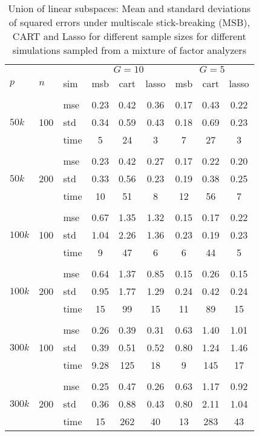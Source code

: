 \documentclass{article} %
\begin{document}
\begin{table}[t]
\caption{Union of linear subspaces: Mean and standard deviations of squared errors under multiscale stick-breaking (MSB), CART and Lasso for different sample sizes for different simulations sampled from a mixture of factor analyzers}\label{table:mfa}
\vskip 0.15in
\begin{center}
\begin{small}
\begin{sc}
\begin{tabular}{lllcccccc}
\hline
&&&\multicolumn{3}{c}{$G=10$}&\multicolumn{3}{c}{$G=5$}\\
$p$&$n$& sim& msb&cart&lasso & msb&cart&lasso\\
\\
\multirow{3}{*}{$50k$}&\multirow{3}{*}{100}&mse&0.23&0.42&0.36&0.17&0.43&0.22\\
&&std & 0.34 &0.59&0.43&0.18&0.69&0.23\\
&&time &5&24 & 3&7&27&3\\

\\
\multirow{3}{*}{$50k$}&\multirow{3}{*}{200}&mse&0.23 &0.42 &0.27&0.17&0.22&0.20\\
&&std & 0.33& 0.56&0.23&0.19&0.38&0.25\\
&&time & 10 &51&8&12&56&7\\

\\
\multirow{3}{*}{$100k$}&\multirow{3}{*}{100}&mse&0.67&1.35&1.32&0.15&0.17&0.22\\
&&std & 1.04&2.26&1.36&0.23&0.19&0.23\\
&&time &9&47&6&6&44&5\\

\\
\multirow{3}{*}{$100k$}&\multirow{3}{*}{200}&mse&0.64&1.37&0.85&0.15&0.26&0.15\\
&&std &0.95 &1.77&1.29&0.24&0.42&0.24\\
&&time &15&99&15&11&89&15\\
\\
\multirow{3}{*}{$300k$}&\multirow{3}{*}{100}&mse& 0.26&0.39&0.31&0.63&1.40&1.01\\
&&std &0.39&0.51&0.52&0.80 &1.24& 1.46 \\
&&time &9.28&125&18&9 &145& 17\\
\\
\multirow{3}{*}{$300k$}&\multirow{3}{*}{200}&mse&0.25&0.47&0.26&0.63&1.17&0.92\\
&&std &0.36&0.88&0.43 & 0.80&2.11&1.04 \\
&&time &15&262&40&13&283&43\\



\end{tabular}
\end{sc}
\end{small}
\end{center}
\end{table}
\end{document}
